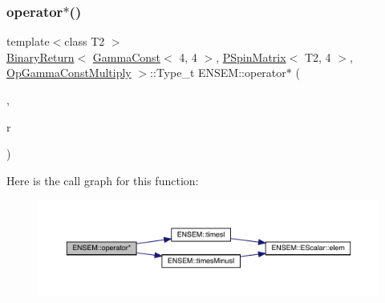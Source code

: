 \subsubsection{\texorpdfstring{operator$\ast$()}{operator*()}\hspace{0.1cm}{\footnotesize\ttfamily [5/64]}}
{\footnotesize\ttfamily template$<$class T2 $>$ \\
\mbox{\hyperlink{structENSEM_1_1BinaryReturn}{Binary\+Return}}$<$ \mbox{\hyperlink{classENSEM_1_1GammaConst}{Gamma\+Const}}$<$ 4, 4 $>$, \mbox{\hyperlink{classENSEM_1_1PSpinMatrix}{P\+Spin\+Matrix}}$<$ T2, 4 $>$, \mbox{\hyperlink{structENSEM_1_1OpGammaConstMultiply}{Op\+Gamma\+Const\+Multiply}} $>$\+::Type\+\_\+t E\+N\+S\+E\+M\+::operator$\ast$ (\begin{DoxyParamCaption}\item[{const \mbox{\hyperlink{classENSEM_1_1GammaConst}{Gamma\+Const}}$<$ 4, 4 $>$ \&}]{,  }\item[{const \mbox{\hyperlink{classENSEM_1_1PSpinMatrix}{P\+Spin\+Matrix}}$<$ T2, 4 $>$ \&}]{r }\end{DoxyParamCaption})\hspace{0.3cm}{\ttfamily [inline]}}

Here is the call graph for this function\+:\nopagebreak
\begin{figure}[H]
\begin{center}
\leavevmode
\includegraphics[width=350pt]{d6/df5/group__primspinmatrix_gabc287f892d11c49158f8022c393a8516_cgraph}
\end{center}
\end{figure}
\mbox{\label{group__primspinmatrix_ga1fbaa359542d933fd3150bbcdf5006d5}} 
